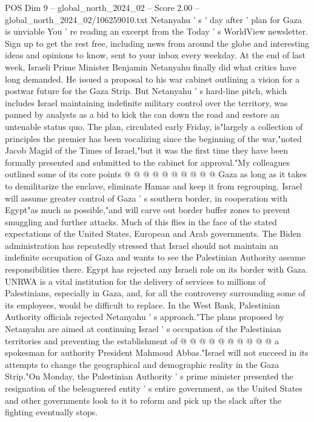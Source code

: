 \begin{textsample}{POS Dim 9 – global\_north\_2024\_02 – Score 2.00 – global\_north\_2024\_02/106259010.txt}  \label{ex:f9_pos_162}
Netanyahu ' s ' day after ' plan for Gaza is unviable You ' re reading an excerpt from the Today ' s WorldView newsletter.
Sign up to get the rest free, including news from around the globe and interesting ideas and opinions to know, sent to your inbox every weekday.
At the end of last week, Israeli Prime Minister Benjamin Netanyahu finally did what critics have long demanded.
He issued a proposal to his war cabinet outlining a vision for a postwar future for the Gaza Strip.
But Netanyahu ' s hard-line pitch, which includes Israel maintaining indefinite military control over the territory, was panned by analysts as a bid to kick the can down the road and restore an untenable status quo.
The plan, circulated early Friday, is"largely a collection of principles the premier has been vocalizing since the beginning of the war,"noted Jacob Magid of the Times of Israel,"but it was the first time they have been formally presented and submitted to the cabinet for approval."My colleagues outlined some of its core points @ @ @ @ @ @ @ @ @ @ Gaza as long as it takes to demilitarize the enclave, eliminate Hamas and keep it from regrouping.
Israel will assume greater control of Gaza ' s southern border, in cooperation with Egypt"as much as possible,"and will carve out border buffer zones to prevent smuggling and further attacks.
Much of this flies in the face of the stated expectations of the United States, European and Arab governments.
The Biden administration has repeatedly stressed that Israel should not maintain an indefinite occupation of Gaza and wants to see the Palestinian Authority assume responsibilities there.
Egypt has rejected any Israeli role on its border with Gaza.
UNRWA is a vital institution for the delivery of services to millions of Palestinians, especially in Gaza, and, for all the controversy surrounding some of its employees, would be difficult to replace.
In the West Bank, Palestinian Authority officials rejected Netanyahu ' s approach."The plans proposed by Netanyahu are aimed at continuing Israel ' s occupation of the Palestinian territories and preventing the establishment of @ @ @ @ @ @ @ @ @ @ a spokesman for authority President Mahmoud Abbas."Israel will not succeed in its attempts to change the geographical and demographic reality in the Gaza Strip."On Monday, the Palestinian Authority ' s prime minister presented the resignation of the beleaguered entity ' s entire government, as the United States and other governments look to it to reform and pick up the slack after the fighting eventually stops.

\end{textsample}
